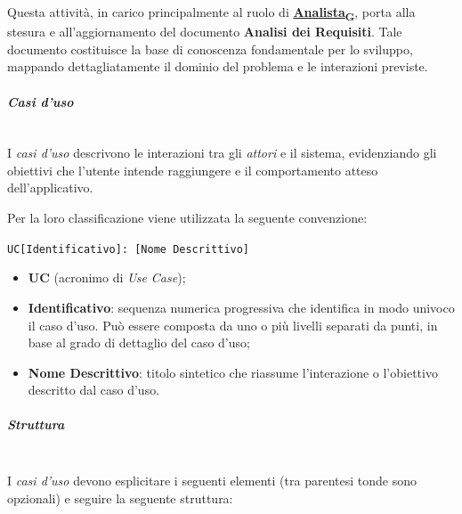 \documentclass[12pt, a4paper]{article}
\newcommand{\urlglossario}{https://skynetunigroup.github.io/Code_Guardian/Documentazione/RTB/glossario_v1.0.0.pdf} %
\newcommand{\glo}[2]{\href{\urlglossario\#nameddest=#2}{#1\textsubscript{G}}}
\begin{document}
Questa attività, in carico principalmente al ruolo di \textbf{\glo{Analista}{analista}}, porta alla stesura e all'aggiornamento del documento \textbf{Analisi dei Requisiti}. Tale documento costituisce la base di conoscenza fondamentale per lo sviluppo, mappando dettagliatamente il dominio del problema e le interazioni previste.

\paragraph{\textit{Casi d'uso}}\mbox{}\\
I \textit{casi d'uso} descrivono le interazioni tra gli \textit{attori} e il sistema, evidenziando gli obiettivi che l'utente intende raggiungere e il comportamento atteso dell'applicativo.

Per la loro classificazione viene utilizzata la seguente convenzione:

\begin{center}
    \texttt{UC[Identificativo]: [Nome Descrittivo]}
\end{center}

\begin{itemize}
    \item \textbf{UC} (acronimo di \textit{Use Case});

    \item \textbf{Identificativo}: sequenza numerica progressiva che identifica in modo univoco il caso d'uso. Può essere composta da uno o più livelli separati da punti, in base al grado di dettaglio del caso d'uso;

    \item \textbf{Nome Descrittivo}: titolo sintetico che riassume l'interazione o l'obiettivo descritto dal caso d'uso.
\end{itemize}

\newpage
\subparagraph{Struttura}\mbox{}\\
I \textit{casi d'uso} devono esplicitare i seguenti elementi (tra parentesi tonde sono opzionali) e seguire la seguente struttura: 
\end{document}
